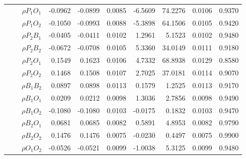 \documentclass[letterpaper]{article}
\begin{document}
\begin{table}[h]
\begin{tabular}{cccrrrrrrr}
            &             & $\rho{P_1O_1}$ & -0.0962                & -0.0899                & 0.0085                 & -6.5609                & 74.2276                & 0.0106                   & 0.9370                 \\
            &             & $\rho{P_1O_2}$ & -0.1050                & -0.0993                & 0.0088                 & -5.3898                & 64.1506                & 0.0105                   & 0.9420                 \\
            &             & $\rho{P_2B_1}$ & -0.0405                & -0.0411                & 0.0102                 & 1.2961                 & 5.1523                 & 0.0102                   & 0.9480                 \\
            &             & $\rho{P_2B_2}$ & -0.0672                & -0.0708                & 0.0105                 & 5.3360                 & 34.0149                & 0.0111                   & 0.9180                 \\
            &             & $\rho{P_2O_1}$ & 0.1549                 & 0.1623                 & 0.0106                 & 4.7332                 & 68.8938                & 0.0129                   & 0.8580                 \\
            &             & $\rho{P_2O_2}$ & 0.1468                 & 0.1508                 & 0.0107                 & 2.7025                 & 37.0181                & 0.0114                   & 0.9070                 \\
            &             & $\rho{B_1B_2}$ & 0.0897                 & 0.0898                 & 0.0113                 & 0.1579                 & 1.2525                 & 0.0113                   & 0.9170                 \\
            &             & $\rho{B_1O_1}$ & 0.0209                 & 0.0212                 & 0.0098                 & 1.3036                 & 2.7856                 & 0.0098                   & 0.9490                 \\
            &             & $\rho{B_1O_2}$ & -0.1080                & -0.1080                & 0.0103                 & -0.0175                & 0.1832                 & 0.0103                   & 0.9470                 \\
            &             & $\rho{B_2O_1}$ & 0.0681                 & 0.0685                 & 0.0082                 & 0.5891                 & 4.8953                 & 0.0082                   & 0.9790                 \\
            &             & $\rho{B_2O_2}$ & 0.1476                 & 0.1476                 & 0.0075                 & -0.0230                & 0.4497                 & 0.0075                   & 0.9900                 \\
            &             & $\rho{O_1O_2}$ & -0.0526                & -0.0521                & 0.0099                 & -1.0038                & 5.3125                 & 0.0099                   & 0.9480                 \\\hline
\end{tabular}
\end{table}
\end{document}
